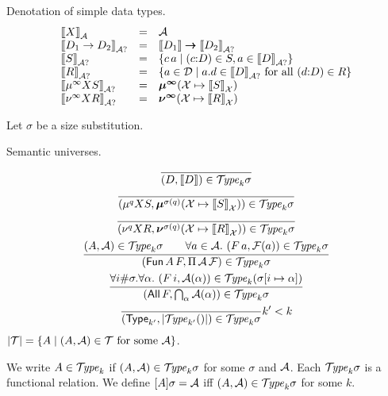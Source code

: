 \documentclass{article}
\begin{document}
Denotation of simple data types.
\[
\begin{array}{lll}
  \Den{X}{\A}
    & = & \A \\
  \Den{D_1 \to D_2}{\A?}
    & = & \den{D_1} \TO \DenA{D_2} \\
  \DenA{S}
    & = & \{ c\,a \mid (c{:}D) \in S, a \in \DenA D \} \\
  \DenA{R}
    & = & \{ a \in \D \mid a.d \in \DenA D \mforall (d{:}D) \in R \}
    \\
  \DenA{\muinf S} & = & \MUINF (\X \mapsto \Den{S}{\X}) \\
  \DenA{\nuinf R} & = & \NUINF (\X \mapsto \Den{R}{\X}) \\
\end{array}
\]

Let $\sigma$ be a size substitution.

Semantic universes.
\begin{gather*}
  \ru{
    }{\tyint D {\den D} k {\sigma}}
\\
  \ru{
    }{\tyint {\mu^q X S} {\MU^{\sigma(q)} (\X \mapsto \Den S \X)} k
      \sigma}
\\
  \ru{
    }{\tyint {\nu^q X R} {\NU^{\sigma(q)} (\X \mapsto \Den R \X)} k
      \sigma}
\\
  \ru{\tyint A \A k \sigma \qquad
      \forall a \in \A.\ \tyint {F\,a} {\F(a)} k \sigma
    }{\tyint{\Fun\,A\,F}{\PIAF} k \sigma}
\\
  \ru{\forall i\#\sigma. \forall \alpha.\ \tyint {F\,i} {\A(\alpha)} k {(\update \sigma i
      \alpha)}
    }{\tyint {\All\,F} {\bigcap_{\alpha} \A(\alpha)} k \sigma}
\\
   \ru{
     }{\tyint {\Type_{k'}} {|\TYPE_{k'}()|} {k} \sigma
     }{k' < k}
\end{gather*}
$|\mathcal{T}| = \{ A \mid (A,\mathcal{A}) \in \mathcal{T} \ \mbox{for some}\  \mathcal{A} \}$.

We write $A \in \mathcal{T}\!\mathit{ype}_k$ if $(A,\mathcal{A}) \in \mathcal{T}\!\mathit{ype}_k\sigma$ for some
$\sigma$ and $\mathcal{A}$.
Each $\mathcal{T}\!\mathit{ype}_k\sigma$ is a functional relation.
We define $[A]\sigma = \mathcal{A}$ iff $(A,\mathcal{A})\in\mathcal{T}\!\mathit{ype}_{k}{\sigma}$ for some $k$.
\end{document}

